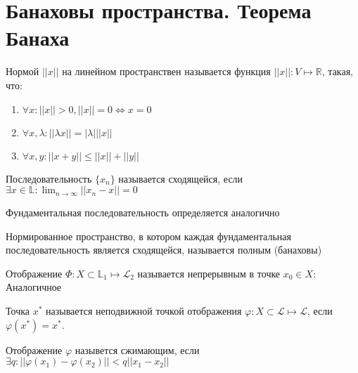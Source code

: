 \documentclass[document.tex]{subfiles}
\begin{document}
\section{Банаховы пространства. Теорема Банаха}

\begin{definition}
Нормой $||x||$ на линейном пространствен называется функция $||x|| : V \mapsto \mathbb{R}$, такая, что:
	\begin{enumerate}
		\item $\forall x : ||x|| > 0, ||x|| = 0 \Leftrightarrow x = 0$
		\item $\forall x, \lambda : ||\lambda x|| = |\lambda| ||x||$
		\item $\forall x, y : ||x + y|| \leq ||x|| + ||y||$
	\end{enumerate}
\end{definition}

\begin{definition}
	Последовательность $\{x_n\}$ называется сходящейся, если $\exists x \in \mathbb{L}: \lim_{n \rightarrow \infty} ||x_n - x|| = 0$
\end{definition}

\begin{definition}
	Фундаментальная последовательность определяется аналогично
\end{definition}

\begin{definition}
	Нормированное пространство, в котором каждая фундаментальная последовательность является сходящейся, называется полным (банаховы)
\end{definition}

\begin{definition}
	Отображение $\Phi : X \subset \mathbb{L}_1 \mapsto \mathcal{L}_2$ называется непрерывным в точке $x_0 \in X$:
	Аналогичное
	
\end{definition}

\begin{definition}
	Точка $x^*$ называется неподвижной точкой отображения $\varphi : X \subset \mathcal{L} \mapsto \mathcal{L}$, если $\varphi(x^*) = x^*$.
\end{definition}

\begin{definition}
	Отображение $\varphi$ назывется сжимающим, если $\exists q : ||\varphi(x_1) - \varphi(x_2)|| < q ||x_1 - x_2||$
\end{definition}
\end{document}
